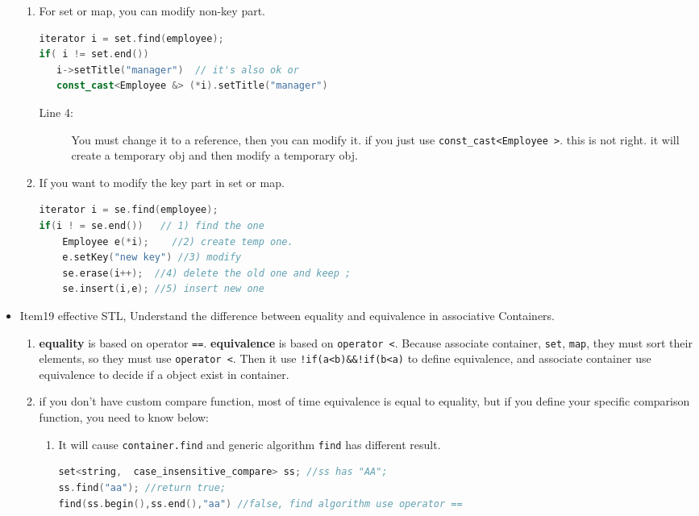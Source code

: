 \documentclass[a4paper,11pt,twoside]{book}
\begin{document}
\begin{itemize}
\begin{enumerate}
   \item For set or map, you can modify non-key part.
\begin{lstlisting}[frame=single, language=c++]
iterator i = set.find(employee);
if( i != set.end())
   i->setTitle("manager")  // it's also ok or
   const_cast<Employee &> (*i).setTitle("manager")
\end{lstlisting}
\begin{description}
	\item[Line 4:]  You must change it to a reference, then you can modify it. if you just use \texttt{const\_cast<Employee >}. this is not right. it will create a temporary obj and then modify a temporary obj.
\end{description}

\item If you want to modify the key part in set or map.
\begin{lstlisting}[frame=single, language=c++]
iterator i = se.find(employee); 
if(i ! = se.end())   // 1) find the one
	Employee e(*i);    //2) create temp one.
	e.setKey("new key") //3) modify
	se.erase(i++);  //4) delete the old one and keep ;
	se.insert(i,e); //5) insert new one
\end{lstlisting}
 \end{enumerate}

\item Item19 effective STL, Understand the difference between equality and equivalence in associative Containers.
  \begin{enumerate}
  \item \textbf{equality} is based on operator \texttt{==}. \textbf{equivalence} is based on \texttt{operator <}. Because associate container, \texttt{set}, \texttt{map}, they must sort their elements, so they must use \texttt{operator <}. Then it use \texttt{!if(a<b)\&\&!if(b<a)} to define equivalence, and associate container use equivalence to decide if a object exist in container.
  
  \item if you don't have custom compare function, most of time equivalence is equal to equality, but if you define your specific comparison function, you need to know below:
  
	\begin{enumerate}

  		\item It will cause \texttt{container.find} and generic algorithm \texttt{find} has different result.
\begin{lstlisting}[frame=single, language=c++]
set<string,  case_insensitive_compare> ss; //ss has "AA";
ss.find("aa"); //return true;
find(ss.begin(),ss.end(),"aa") //false, find algorithm use operator ==
\end{lstlisting}


\end{enumerate}
\end{enumerate}
\end{itemize}
\end{document}

